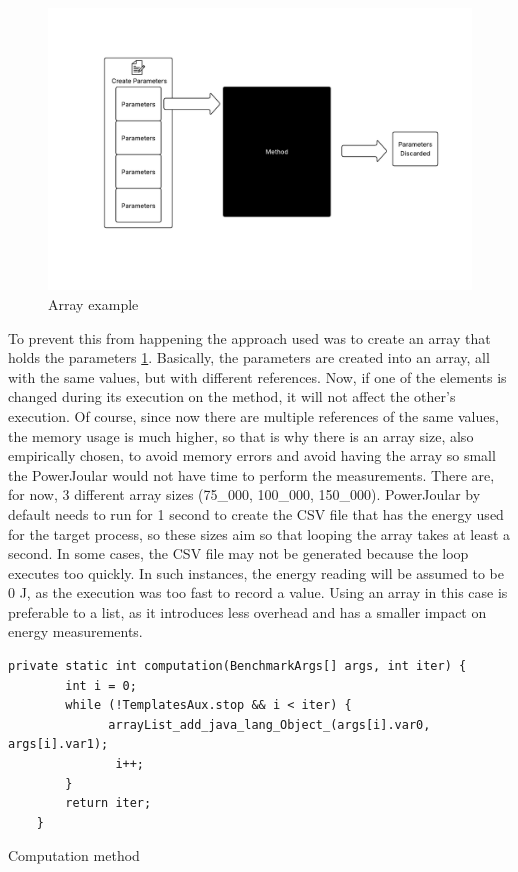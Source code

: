 \begin{figure}
  \centering
  \includegraphics[width = 1 \textwidth]{figures/array.pdf}
  \caption{Array example}
  \label{fig:array}
\end{figure}

To prevent this from happening the approach used was to create an array that holds the parameters \ref{fig:array}. Basically, the parameters are created into an array, all with the same values, but with different references. Now, if one of the elements is changed during its execution on the method, it will not affect the other's execution. Of course, since now there are multiple references of the same values, the memory usage is much higher, so that is why there is an array size, also empirically chosen, to avoid memory errors and avoid having the array so small the PowerJoular would not have time to perform the measurements. There are, for now, 3 different array sizes (75_000, 100_000, 150_000). PowerJoular by default needs to run for 1 second to create the CSV file that has the energy used for the target process, so these sizes aim so that looping the array takes at least a second. In some cases, the CSV file may not be generated because the loop executes too quickly. In such instances, the energy reading will be assumed to be 0 J, as the execution was too fast to record a value. Using an array in this case is preferable to a list, as it introduces less overhead and has a smaller impact on energy measurements.


\begin{listing}[H]
\begin{verbatim}
private static int computation(BenchmarkArgs[] args, int iter) {
        int i = 0;
        while (!TemplatesAux.stop && i < iter) {
              arrayList_add_java_lang_Object_(args[i].var0, args[i].var1);
               i++;
        }
        return iter;
    }
\end{verbatim}
\caption{Computation method}            
\label{lst:Computation_method}
\end{listing}

